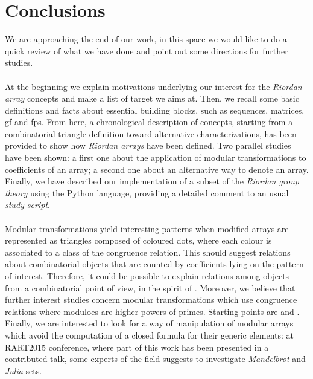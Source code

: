 
\chapter{Conclusions}
\label{ch:conclusions}

We are approaching the end of our work, in this space we would like
to do a quick review of what we have done and point out some directions
for further studies.
\\\\

At the beginning we explain motivations underlying our interest for the
\emph{Riordan array} concepts and make a list of target we aims at.  Then, we
recall some basic definitions and facts about essential building blocks, such
as sequences, matrices, \ac{gf} and \ac{fps}. From here, a chronological
description of concepts, starting from a combinatorial triangle definition
toward alternative characterizations, has been provided to show how
\emph{Riordan arrays} have been defined. Two parallel studies have been shown:
a first one about the application of modular transformations to coefficients of
an array; a second one about an alternative way to denote an array.  Finally,
we have described our implementation of a subset of the \emph{Riordan group
theory} using the Python language, providing a detailed comment to an usual
\emph{study script}.
\\\\
\indent Modular transformations yield interesting patterns when modified arrays
are represented as triangles composed of coloured dots, where each colour is
associated to a class of the congruence relation. This should suggest relations
about combinatorial objects that are counted by coefficients lying on the
pattern of interest. Therefore, it could be possible to explain relations among
objects from a combinatorial point of view, in the spirit of
\cite{benjamin:quinn:proofs:really:count}. Moreover, we believe that further
interest studies concern modular transformations which use congruence
relations where moduloes are higher powers of primes. Starting points are
\cite{sved:1988} and \cite{mclean:1974}.  Finally, we are interested to look
for a way of manipulation of modular arrays which avoid the computation of a
closed formula for their generic elements: at RART$2015$ conference, where
part of this work has been presented in a contributed talk, some experts of
the field suggests to investigate \emph{Mandelbrot} and \emph{Julia} sets.
\\\\
